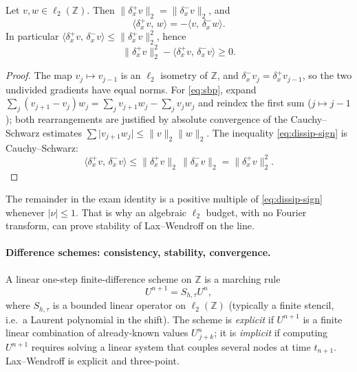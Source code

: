 \begin{lemma}
\label{lem:sbp}
Let \(v,w\in\ell_2(\mathbb{Z})\). Then \(\|\delta_x^+ v\|_2=\|\delta_x^- v\|_2\), and
\begin{equation}
\label{eq:sbp}
\langle \delta_x^+ v,\, w\rangle
=
-
\langle v,\, \delta_x^- w\rangle.
\end{equation}
In particular \(\langle \delta_x^+ v,\, \delta_x^- v\rangle\le\|\delta_x^+ v\|_2^2\), hence
\begin{equation}
\label{eq:dissip-sign}
\|\delta_x^+ v\|_2^2
-
\langle \delta_x^+ v,\, \delta_x^- v\rangle
\ge
0.
\end{equation}
\end{lemma}

\begin{proof}
The map \(v_j\mapsto v_{j-1}\) is an \(\ell_2\) isometry of \(\mathbb{Z}\), and \(\delta_x^- v_j=\delta_x^+ v_{j-1}\), so the two undivided gradients have equal norms. For \eqref{eq:sbp}, expand \(\sum_j(v_{j+1}-v_j)w_j=\sum_j v_{j+1}w_j-\sum_j v_j w_j\) and reindex the first sum (\(j\mapsto j-1\)); both rearrangements are justified by absolute convergence of the Cauchy--Schwarz estimates \(\sum\lvert v_{j+1}w_j\rvert\le\|v\|_2\|w\|_2\). The inequality \eqref{eq:dissip-sign} is Cauchy--Schwarz:
\[
\langle \delta_x^+ v,\, \delta_x^- v\rangle
\le
\|\delta_x^+ v\|_2\,\|\delta_x^- v\|_2
=
\|\delta_x^+ v\|_2^2.
\]
\end{proof}

The remainder in the exam identity is a positive multiple of \eqref{eq:dissip-sign} whenever \(\lvert\nu\rvert\le 1\). That is why an algebraic \(\ell_2\) budget, with no Fourier transform, can prove stability of Lax--Wendroff on the line.

\paragraph{Difference schemes: consistency, stability, convergence.}

\begin{definition}
\label{def:scheme}
A linear one-step finite-difference scheme on \(\mathbb{Z}\) is a marching rule
\[
U^{n+1}
=
S_{h,\tau} U^n,
\]
where \(S_{h,\tau}\) is a bounded linear operator on \(\ell_2(\mathbb{Z})\) (typically a finite stencil, i.e.\ a Laurent polynomial in the shift). The scheme is \emph{explicit} if \(U^{n+1}\) is a finite linear combination of already-known values \(U^n_{\,j+k}\); it is \emph{implicit} if computing \(U^{n+1}\) requires solving a linear system that couples several nodes at time \(t_{n+1}\). Lax--Wendroff is explicit and three-point.
\end{definition}


